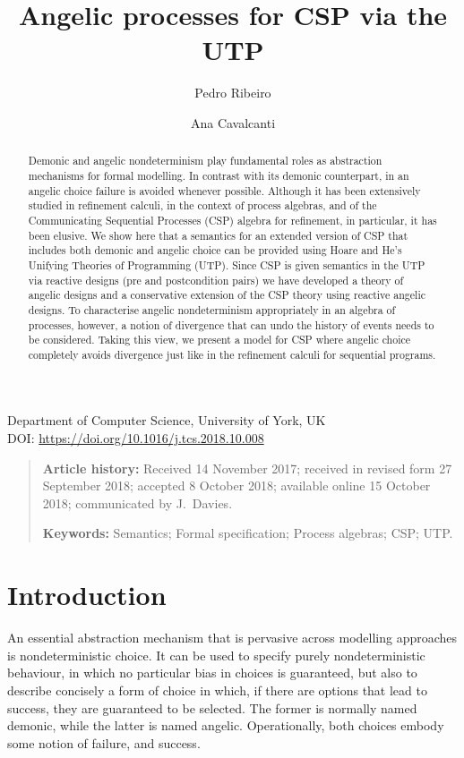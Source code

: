 \documentclass[11pt]{article}
\title{Angelic processes for CSP via the UTP}
\author{Pedro Ribeiro \and Ana Cavalcanti}
\date{}
\begin{document}
\maketitle

\begin{center}
\small Department of Computer Science, University of York, UK\\
\small DOI: \url{https://doi.org/10.1016/j.tcs.2018.10.008}
\end{center}

\begin{quote}\small
\textbf{Article history:} Received 14 November 2017; received in revised form 27 September 2018; accepted 8 October 2018; available online 15 October 2018; communicated by J.~Davies.

\textbf{Keywords:} Semantics; Formal specification; Process algebras; CSP; UTP.
\end{quote}

\begin{abstract}
Demonic and angelic nondeterminism play fundamental roles as abstraction mechanisms for formal modelling. In contrast with its demonic counterpart, in an angelic choice failure is avoided whenever possible. Although it has been extensively studied in refinement calculi, in the context of process algebras, and of the Communicating Sequential Processes (CSP) algebra for refinement, in particular, it has been elusive. We show here that a semantics for an extended version of CSP that includes both demonic and angelic choice can be provided using Hoare and He’s Unifying Theories of Programming (UTP). Since CSP is given semantics in the UTP via reactive designs (pre and postcondition pairs) we have developed a theory of angelic designs and a conservative extension of the CSP theory using reactive angelic designs. To characterise angelic nondeterminism appropriately in an algebra of processes, however, a notion of divergence that can undo the history of events needs to be considered. Taking this view, we present a model for CSP where angelic choice completely avoids divergence just like in the refinement calculi for sequential programs.
\end{abstract}

\tableofcontents
\bigskip
\section{Introduction}
An essential abstraction mechanism that is pervasive across modelling approaches is nondeterministic choice. It can be used to specify purely nondeterministic behaviour, in which no particular bias in choices is guaranteed, but also to describe concisely a form of choice in which, if there are options that lead to success, they are guaranteed to be selected. The former is normally named demonic, while the latter is named angelic. Operationally, both choices embody some notion of failure, and success.
\end{document}
